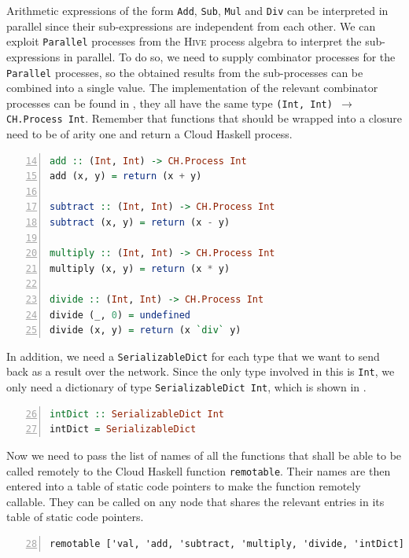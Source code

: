 Arithmetic expressions of the form \texttt{Add}, \texttt{Sub}, \texttt{Mul} and \texttt{Div} can be interpreted in parallel since their sub-expressions are independent from each other. We can exploit \texttt{Parallel} processes from the \textsc{Hive} process algebra to interpret the sub-expressions in parallel. To do so, we need to supply combinator processes for the \texttt{Parallel} processes, so the obtained results from the sub-processes can be combined into a single value. The implementation of the relevant combinator processes can be found in , they all have the same type \texttt{(Int, Int) $\to$ CH.Process Int}. Remember that functions that should be wrapped into a closure need to be of arity one and return a \textsf{Cloud Haskell} process.
\begin{lstlisting}[language=Haskell, caption=\textsf{Cloud Haskell} processes for the combination of results from processes that have been executed in parallel., label=lst:arith_combinators,numbers=left, frame=bt, firstnumber=14]
add :: (Int, Int) -> CH.Process Int
add (x, y) = return (x + y)

subtract :: (Int, Int) -> CH.Process Int
subtract (x, y) = return (x - y)

multiply :: (Int, Int) -> CH.Process Int
multiply (x, y) = return (x * y)

divide :: (Int, Int) -> CH.Process Int
divide (_, 0) = undefined
divide (x, y) = return (x `div` y)
\end{lstlisting}

In addition, we need a \texttt{SerializableDict} for each type that we want to send back as a result over the network. Since the only type involved in this is \texttt{Int}, we only need a dictionary of type \texttt{SerializableDict Int}, which is shown in .
\begin{lstlisting}[language=Haskell, caption=\texttt{SerializableDict} for values of type \texttt{Int}., label=lst:arith_dict, numbers=left, frame=bt, firstnumber=26]
intDict :: SerializableDict Int
intDict = SerializableDict
\end{lstlisting}

Now we need to pass the list of names of all the functions that shall be able to be called remotely to the \textsf{Cloud Haskell} function \texttt{remotable}. Their names are then entered into a table of static code pointers to make the function remotely callable. They can be called on any node that shares the relevant entries in its table of static code pointers.
\begin{lstlisting}[language=Haskell, caption=Making functions remotely callable., label=lst:arith_remotable, numbers=left, frame=bt, firstnumber=28]
remotable ['val, 'add, 'subtract, 'multiply, 'divide, 'intDict]
\end{lstlisting}

